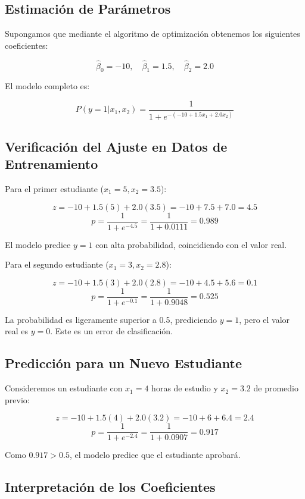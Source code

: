 \documentclass[12pt]{article}
\begin{document}
\subsection{Estimación de Parámetros}

Supongamos que mediante el algoritmo de optimización obtenemos los siguientes coeficientes:

\[
\hat{\beta}_0 = -10, \quad \hat{\beta}_1 = 1.5, \quad \hat{\beta}_2 = 2.0
\]

El modelo completo es:

\[
P(y=1|x_1, x_2) = \frac{1}{1 + e^{-(-10 + 1.5x_1 + 2.0x_2)}}
\]

\subsection{Verificación del Ajuste en Datos de Entrenamiento}

Para el primer estudiante ($x_1=5, x_2=3.5$):

\[
z = -10 + 1.5(5) + 2.0(3.5) = -10 + 7.5 + 7.0 = 4.5
\]
\[
p = \frac{1}{1 + e^{-4.5}} = \frac{1}{1 + 0.0111} = 0.989
\]

El modelo predice $y=1$ con alta probabilidad, coincidiendo con el valor real.

Para el segundo estudiante ($x_1=3, x_2=2.8$):

\[
z = -10 + 1.5(3) + 2.0(2.8) = -10 + 4.5 + 5.6 = 0.1
\]
\[
p = \frac{1}{1 + e^{-0.1}} = \frac{1}{1 + 0.9048} = 0.525
\]

La probabilidad es ligeramente superior a 0.5, prediciendo $y=1$, pero el valor real es $y=0$. Este es un error de clasificación.

\subsection{Predicción para un Nuevo Estudiante}

Consideremos un estudiante con $x_1 = 4$ horas de estudio y $x_2 = 3.2$ de promedio previo:

\[
z = -10 + 1.5(4) + 2.0(3.2) = -10 + 6 + 6.4 = 2.4
\]
\[
p = \frac{1}{1 + e^{-2.4}} = \frac{1}{1 + 0.0907} = 0.917
\]

Como $0.917 > 0.5$, el modelo predice que el estudiante aprobará.

\subsection{Interpretación de los Coeficientes}
\end{document}
